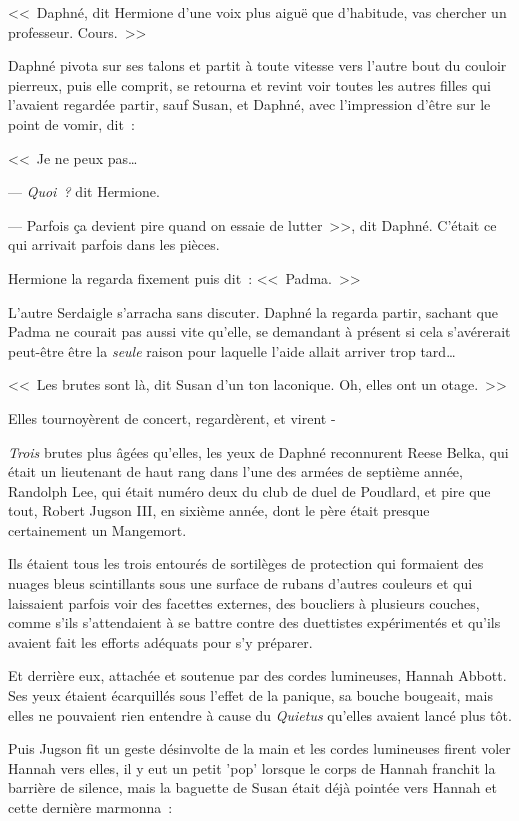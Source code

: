 <<~Daphné, dit Hermione d'une voix plus aiguë que d'habitude, vas chercher un professeur. Cours.~>>

Daphné pivota sur ses talons et partit à toute vitesse vers l'autre bout du couloir pierreux, puis elle comprit, se retourna et revint voir toutes les autres filles qui l'avaient regardée partir, sauf Susan, et Daphné, avec l'impression d'être sur le point de vomir, dit~:

<<~Je ne peux pas…

--- \emph{Quoi~?} dit Hermione.

--- Parfois ça devient pire quand on essaie de lutter~>>, dit Daphné. C'était ce qui arrivait parfois dans les pièces.

Hermione la regarda fixement puis dit~: <<~Padma.~>>

L'autre Serdaigle s'arracha sans discuter. Daphné la regarda partir, sachant que Padma ne courait pas aussi vite qu'elle, se demandant à présent si cela s'avérerait peut-être être la \emph{seule} raison pour laquelle l'aide allait arriver trop tard…

<<~Les brutes sont là, dit Susan d'un ton laconique. Oh, elles ont un otage.~>>

Elles tournoyèrent de concert, regardèrent, et virent -

\emph{Trois} brutes plus âgées qu'elles, les yeux de Daphné reconnurent Reese Belka, qui était un lieutenant de haut rang dans l'une des armées de septième année, Randolph Lee, qui était numéro deux du club de duel de Poudlard, et pire que tout, Robert Jugson III, en sixième année, dont le père était presque certainement un Mangemort.

Ils étaient tous les trois entourés de sortilèges de protection qui formaient des nuages bleus scintillants sous une surface de rubans d'autres couleurs et qui laissaient parfois voir des facettes externes, des boucliers à plusieurs couches, comme s'ils s'attendaient à se battre contre des duettistes expérimentés et qu'ils avaient fait les efforts adéquats pour s'y préparer.

Et derrière eux, attachée et soutenue par des cordes lumineuses, Hannah Abbott. Ses yeux étaient écarquillés sous l'effet de la panique, sa bouche bougeait, mais elles ne pouvaient rien entendre à cause du \emph{Quietus} qu'elles avaient lancé plus tôt.

Puis Jugson fit un geste désinvolte de la main et les cordes lumineuses firent voler Hannah vers elles, il y eut un petit 'pop' lorsque le corps de Hannah franchit la barrière de silence, mais la baguette de Susan était déjà pointée vers Hannah et cette dernière marmonna~:


